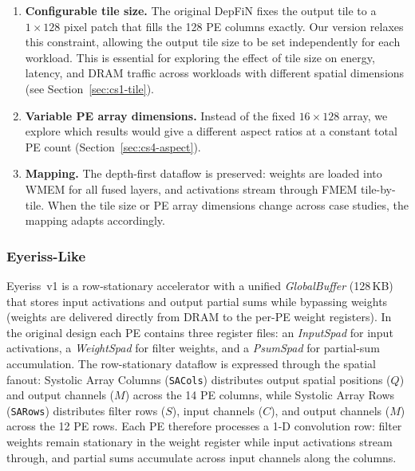 \begin{enumerate}
  \item \textbf{Configurable tile size.}
        The original DepFiN fixes the output tile to a $1 \times 128$
        pixel patch that fills the 128 PE columns exactly.
        Our version relaxes this constraint, allowing the output tile
        size to be set independently for each workload.
        This is essential for exploring the effect of tile size on
        energy, latency, and DRAM traffic across workloads with
        different spatial dimensions (see Section~\ref{sec:cs1-tile}).

  \item \textbf{Variable PE array dimensions.}
        Instead of the fixed $16 \times 128$ array,
        we explore which results would give a different aspect ratios at a constant total PE count (Section~\ref{sec:cs4-aspect}).

  \item \textbf{Mapping.}
        The depth-first dataflow is preserved: weights are loaded into
        WMEM for all fused layers, and activations stream through FMEM
        tile-by-tile.
        When the tile size or PE array dimensions change across case
        studies, the mapping adapts accordingly.
\end{enumerate}

\subsubsection{Eyeriss-Like}
\label{sec:eyeriss-like}

Eyeriss~v1 is a row-stationary accelerator with a unified
\emph{GlobalBuffer} (128\,KB) that stores input activations and output
partial sums while bypassing weights (weights are delivered directly
from DRAM to the per-PE weight registers).
In the original design each PE contains three register files:
an \emph{InputSpad} for input activations,
a \emph{WeightSpad} for filter weights,
and a \emph{PsumSpad} for partial-sum accumulation.
The row-stationary dataflow is expressed through the spatial fanout:
Systolic Array Columns (\texttt{SACols}) distributes output spatial positions ($Q$) and output
channels ($M$) across the 14 PE columns, while Systolic Array Rows (\texttt{SARows})
distributes filter rows ($S$), input channels ($C$), and output channels
($M$) across the 12 PE rows.
Each PE therefore processes a 1-D convolution row: filter weights remain
stationary in the weight register while input activations stream through,
and partial sums accumulate across input channels along the columns.

